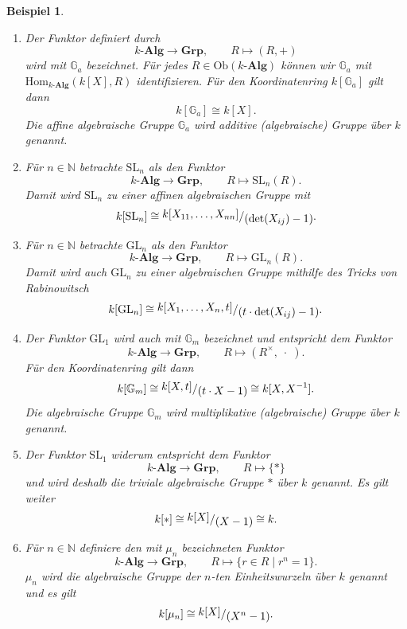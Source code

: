 \documentclass[a4paper, 11pt]{scrartcl}
\newcommand{\N}{\mathbb{N}}
\newcommand{\ringquot}[2]{{\raisebox{.2em}{\(#1\)}/\raisebox{-.2em}{\(#2\)}}}
\newcommand{\Hom}{\text{Hom}}
\newcommand{\Ob}{\text{Ob}}
\theoremstyle{basicstyle}
\newtheorem{beispiel}[definition]{Beispiel}
\begin{document}
    \begin{beispiel}
        \begin{enumerate}
            \item Der Funktor definiert durch
                \[k\textbf{-Alg} \longrightarrow \textbf{Grp}, \qquad R \mapsto (R, +)\]
                wird mit \(\mathbb{G}_a\) bezeichnet.
                Für jedes \(R \in \Ob(k\textbf{-Alg})\) können wir \(\mathbb{G}_a\) mit \(\Hom_{k\textbf{-Alg}}(k[X], R)\) identifizieren.
                Für den Koordinatenring \(k[\mathbb{G}_a]\) gilt dann \[k[\mathbb{G}_a] \cong k[X].\]
                Die affine algebraische Gruppe \(\mathbb{G}_a\) wird \emph{additive (algebraische) Gruppe über \(k\)} genannt.

            \item Für \(n \in \N\) betrachte \(\text{SL}_n\) als den Funktor
                \[k\textbf{-Alg} \longrightarrow \textbf{Grp}, \qquad R \mapsto \text{SL}_n(R).\]
                Damit wird \(\text{SL}_n\) zu einer affinen algebraischen Gruppe mit
                \[k[\text{SL}_n] \cong \ringquot{k[X_{11}, \ldots, X_{nn}]}{(\det (X_{ij}) - 1)}.\]

            \item Für \(n \in \N\) betrachte \(\text{GL}_n\) als den Funktor
                \[k\textbf{-Alg} \longrightarrow \textbf{Grp}, \qquad R \mapsto \text{GL}_n(R).\]
                Damit wird auch \(\text{GL}_n\) zu einer algebraischen Gruppe mithilfe des Tricks von Rabinowitsch
                \[k[\text{GL}_n] \cong \ringquot{k[X_1, \ldots, X_n, t]}{(t \cdot \det(X_{ij}) - 1)}.\]

            \item Der Funktor \(\text{GL}_1\) wird auch mit \(\mathbb{G}_m\) bezeichnet und entspricht dem Funktor
                \[k\textbf{-Alg} \longrightarrow \textbf{Grp}, \qquad R \mapsto (R^\times, \;\cdot\;).\]
                Für den Koordinatenring gilt dann
                \[k[\mathbb{G}_m] \cong \ringquot{k[X, t]}{(t \cdot X - 1)} \cong k[X, X^{-1}].\]
                Die algebraische Gruppe \(\mathbb{G}_m\) wird \emph{multiplikative (algebraische) Gruppe über \(k\)} genannt.

            \item Der Funktor \(\text{SL}_1\) widerum entspricht dem Funktor
                \[k\textbf{-Alg} \longrightarrow \textbf{Grp}, \qquad R \mapsto \{\ast\}\]
                und wird deshalb die \emph{triviale algebraische Gruppe \(\ast\) über \(k\)} genannt.
                Es gilt weiter
                \[k[\ast] \cong \ringquot{k[X]}{(X-1)} \cong k.\]

            \item Für \(n \in \N\) definiere den mit \(\mu_n\) bezeichneten Funktor
                \[k\textbf{-Alg} \longrightarrow \textbf{Grp}, \qquad R \mapsto \{r \in R \;\vert\; r^n = 1\}.\]
                \(\mu_n\) wird die \emph{algebraische Gruppe der \(n\)-ten Einheitswurzeln über \(k\)} genannt und es gilt
                \[k[\mu_n] \cong \ringquot{k[X]}{(X^n - 1)}.\]
        \end{enumerate}
    \end{beispiel}
\end{document}
